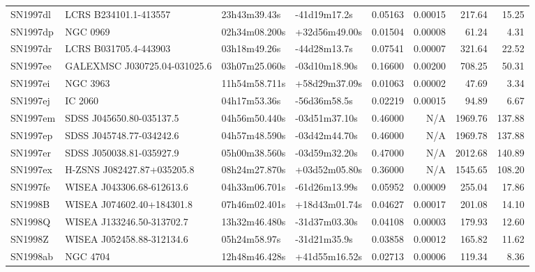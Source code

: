 \begin{longtable}{llllrrrr}
SN1997dl         &           LCRS B234101.1-413557 &    23h43m39.43s &    -41d19m17.2s &  0.05163 &  0.00015 &   217.64 &       15.25 \\
SN1997dp         &                        NGC 0969 &   02h34m08.200s &   +32d56m49.00s &  0.01504 &  0.00008 &    61.24 &        4.31 \\
SN1997dr         &           LCRS B031705.4-443903 &    03h18m49.26s &    -44d28m13.7s &  0.07541 &  0.00007 &   321.64 &       22.52 \\
SN1997ee         &  GALEXMSC J030725.04-031025.6   &   03h07m25.060s &   -03d10m18.90s &  0.16600 &  0.00200 &   708.25 &       50.31 \\
SN1997ei         &                        NGC 3963 &   11h54m58.711s &   +58d29m37.09s &  0.01063 &  0.00002 &    47.69 &        3.34 \\
SN1997ej         &                         IC 2060 &    04h17m53.36s &    -56d36m58.5s &  0.02219 &  0.00015 &    94.89 &        6.67 \\
SN1997em         &        SDSS J045650.80-035137.5 &   04h56m50.440s &   -03d51m37.10s &  0.46000 &      N/A &  1969.76 &      137.88 \\
SN1997ep         &        SDSS J045748.77-034242.6 &   04h57m48.590s &   -03d42m44.70s &  0.46000 &      N/A &  1969.78 &      137.88 \\
SN1997er         &        SDSS J050038.81-035927.9 &   05h00m38.560s &   -03d59m32.20s &  0.47000 &      N/A &  2012.68 &      140.89 \\
SN1997ex         &      H-ZSNS J082427.87+035205.8 &   08h24m27.870s &   +03d52m05.80s &  0.36000 &      N/A &  1545.65 &      108.20 \\
SN1997fe         &       WISEA J043306.68-612613.6 &   04h33m06.701s &   -61d26m13.99s &  0.05952 &  0.00009 &   255.04 &       17.86 \\
SN1998B          &       WISEA J074602.40+184301.8 &   07h46m02.401s &   +18d43m01.74s &  0.04627 &  0.00017 &   201.08 &       14.10 \\
SN1998Q          &       WISEA J133246.50-313702.7 &   13h32m46.480s &   -31d37m03.30s &  0.04108 &  0.00003 &   179.93 &       12.60 \\
SN1998Z          &       WISEA J052458.88-312134.6 &    05h24m58.97s &    -31d21m35.9s &  0.03858 &  0.00012 &   165.82 &       11.62 \\
SN1998ab         &                        NGC 4704 &   12h48m46.428s &   +41d55m16.52s &  0.02713 &  0.00006 &   119.34 &        8.36 \\

\end{longtable}
